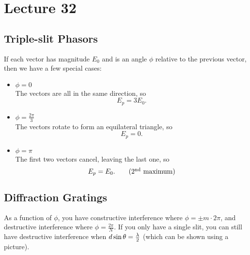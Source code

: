 \documentclass[class=article, crop=false]{standalone}
\begin{document}
  \section{Lecture 32}
  \subsection{Triple-slit Phasors}
  If each vector has magnitude $E_0$ and is an angle $\phi$ relative to the previous vector, then we have a few special cases:
  \begin{itemize}
    \item $\phi = 0$ \\
    The vectors are all in the same direction, so
    \[
      E_p = 3E_0. \tag{maximum}
    \]
    \item $\phi = \frac{2\pi}{3}$ \\
    The vectors rotate to form an equilateral triangle, so
    \[
      E_p = 0.
    \]
    \item $\phi = \pi$ \\
    The first two vectors cancel, leaving the last one, so
    \[
      E_p = E_0. \tag{2\tsup{nd} maximum}
    \]
  \end{itemize}
  \subsection{Diffraction Gratings}
  As a function of $\phi$, you have constructive interference where $\phi = \pm m\cdot 2\pi$, and destructive interference where $\phi = \frac{2\pi}{N}$. If you only have a single slit, you can still have destructive interference when $d\sin\theta = \frac{\lambda}{2}$ (which can be shown using a picture).
\end{document}
